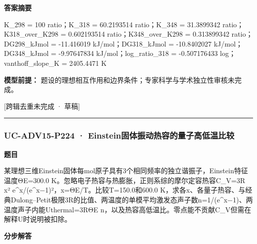 \documentclass[UTF8,11pt,a4paper]{ctexart}
\begin{document}
\noindent\textbf{答案摘要}\par
K\_298 = 100 ratio；K\_318 = 60.2193514 ratio；K\_348 = 31.3899342 ratio；K318\_over\_K298 = 0.602193514 ratio；K348\_over\_K298 = 0.313899342 ratio；DG298\_kJmol = -11.416019 kJ/mol；DG318\_kJmol = -10.8402027 kJ/mol；DG348\_kJmol = -9.97647834 kJ/mol；log\_ratio\_318 = -0.507176433 log；vanthoff\_slope\_K = 2405.4471 K\par
\noindent\textbf{模型前提：}
题设的理想相互作用和边界条件；专家科学与学术独立性审核未完成。\par
\noindent\textcolor{red!65!black}{[跨辑去重未完成 · 草稿]} \par
\medskip\hrule\medskip
{}
\subsubsection*{UC-ADV15-P224 · Einstein固体振动热容的量子高低温比较}
\noindent\textbf{题目}\par
某理想三维Einstein固体每mol原子具有3个相同频率的独立谐振子，Einstein特征温度ΘE=300.0 K。忽略电子热容与热膨胀，正则系综的摩尔定容热容C\_V=3R x² e\textasciicircum{}x/(e\textasciicircum{}x−1)²，x=ΘE/T。比较T=150.0和600.0 K，求各x、各量子热容、与经典Dulong–Petit极限3R的比值、两温度的单模平均激发态声子数n=1/(e\textasciicircum{}x−1)、两温度声子内能Uthermal=3RΘE n，以及热容高低温比。零点能不贡献C\_V但需在解释U时说明被扣除。\par
\medskip\noindent\textbf{分步解答}
\end{document}
